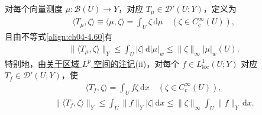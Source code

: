 \documentclass[../../main.tex]{subfiles}%
\begin{document}
\begin{remark}\label{remark:ch04-向量分布例子}
对每个向量测度 $\mu:\mathcal{B}(U)\to Y$，对应 $T_\mu\in\mathcal{D}'(U;Y)$，定义为
\begin{align*}
\langle T_\mu,\zeta\rangle\equiv\langle\mu,\zeta\rangle=\int_U\zeta\,\mathrm{d}\mu\quad(\zeta\in C_c^\infty(U)),
\end{align*}
且由不等式\eqref{align:ch04-4.60}有
\begin{align*}
\|\langle T_\mu,\zeta\rangle\|_Y\leqslant\int_U|\zeta|\,\mathrm{d}|\mu|_w\leqslant\|\zeta\|_\infty|\mu|_w(U).
\end{align*}
特别地，由\hyperref[remark:ch04-区域Lp]{关于区域 $L^p$ 空间的注记}(ii)，对每个 $f\in L^1_{\mathrm{loc}}(U;Y)$ 对应 $T_f\in\mathcal{D}'(U;Y)$，使
\begin{align*}
\langle T_f,\zeta\rangle=\int_Uf\zeta\,\mathrm{d}x\quad(\zeta\in C_c^\infty(U)),
\end{align*}
\begin{align*}
\|\langle T_f,\zeta\rangle\|_Y\leqslant\int_U\|f\|_Y|\zeta|\,\mathrm{d}x\leqslant\|\zeta\|_\infty\int_U\|f\|_Y\,\mathrm{d}x.
\end{align*}
\end{remark}
\end{document}
